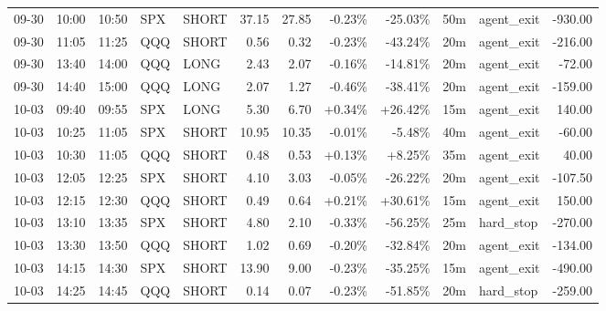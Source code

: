 \documentclass[11pt,a4paper]{article}
\begin{document}
\begin{center}
\begin{longtable}{>{\color{txtmain}}l l l l l r r r r r >{\color{txtmain}}l r}
09-30 & 10:00 & 10:50 & SPX & SHORT & 37.15 & 27.85 & \textcolor{lossred}{-0.23\%} & \textcolor{lossred}{-25.03\%} & 50m & agent\_exit & \textcolor{lossred}{-930.00} \\
09-30 & 11:05 & 11:25 & QQQ & SHORT & 0.56 & 0.32 & \textcolor{lossred}{-0.23\%} & \textcolor{lossred}{-43.24\%} & 20m & agent\_exit & \textcolor{lossred}{-216.00} \\
09-30 & 13:40 & 14:00 & QQQ & LONG & 2.43 & 2.07 & \textcolor{lossred}{-0.16\%} & \textcolor{lossred}{-14.81\%} & 20m & agent\_exit & \textcolor{lossred}{-72.00} \\
09-30 & 14:40 & 15:00 & QQQ & LONG & 2.07 & 1.27 & \textcolor{lossred}{-0.46\%} & \textcolor{lossred}{-38.41\%} & 20m & agent\_exit & \textcolor{lossred}{-159.00} \\
10-03 & 09:40 & 09:55 & SPX & LONG & 5.30 & 6.70 & \textcolor{wingreen}{+0.34\%} & \textcolor{wingreen}{+26.42\%} & 15m & agent\_exit & \textcolor{wingreen}{140.00} \\
10-03 & 10:25 & 11:05 & SPX & SHORT & 10.95 & 10.35 & \textcolor{lossred}{-0.01\%} & \textcolor{lossred}{-5.48\%} & 40m & agent\_exit & \textcolor{lossred}{-60.00} \\
10-03 & 10:30 & 11:05 & QQQ & SHORT & 0.48 & 0.53 & \textcolor{wingreen}{+0.13\%} & \textcolor{wingreen}{+8.25\%} & 35m & agent\_exit & \textcolor{wingreen}{40.00} \\
10-03 & 12:05 & 12:25 & SPX & SHORT & 4.10 & 3.03 & \textcolor{lossred}{-0.05\%} & \textcolor{lossred}{-26.22\%} & 20m & agent\_exit & \textcolor{lossred}{-107.50} \\
10-03 & 12:15 & 12:30 & QQQ & SHORT & 0.49 & 0.64 & \textcolor{wingreen}{+0.21\%} & \textcolor{wingreen}{+30.61\%} & 15m & agent\_exit & \textcolor{wingreen}{150.00} \\
10-03 & 13:10 & 13:35 & SPX & SHORT & 4.80 & 2.10 & \textcolor{lossred}{-0.33\%} & \textcolor{lossred}{-56.25\%} & 25m & hard\_stop & \textcolor{lossred}{-270.00} \\
10-03 & 13:30 & 13:50 & QQQ & SHORT & 1.02 & 0.69 & \textcolor{lossred}{-0.20\%} & \textcolor{lossred}{-32.84\%} & 20m & agent\_exit & \textcolor{lossred}{-134.00} \\
10-03 & 14:15 & 14:30 & SPX & SHORT & 13.90 & 9.00 & \textcolor{lossred}{-0.23\%} & \textcolor{lossred}{-35.25\%} & 15m & agent\_exit & \textcolor{lossred}{-490.00} \\
10-03 & 14:25 & 14:45 & QQQ & SHORT & 0.14 & 0.07 & \textcolor{lossred}{-0.23\%} & \textcolor{lossred}{-51.85\%} & 20m & hard\_stop & \textcolor{lossred}{-259.00} \\

\end{longtable}
\end{center}
\end{document}
